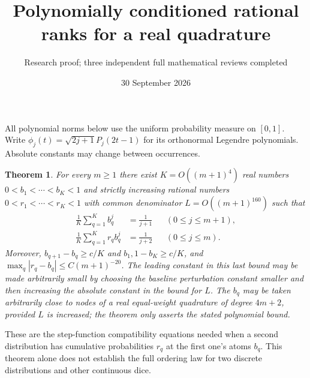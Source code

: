 \documentclass[11pt]{article}
\title{Polynomially conditioned rational ranks for a real quadrature}
\author{Research proof; three independent full mathematical reviews completed}
\date{30 September 2026}
\newtheorem{theorem}{Theorem}
\begin{document}
\maketitle
All polynomial norms below use the uniform probability measure on $[0,1]$.
Write $\phi_j(t)=\sqrt{2j+1}P_j(2t-1)$ for its orthonormal Legendre
polynomials. Absolute constants may change between occurrences.

\begin{theorem}\label{main}
For every $m\ge1$ there exist $K=O((m+1)^4)$ real numbers
$0<b_1<\cdots<b_K<1$ and strictly increasing rational numbers
$0<r_1<\cdots<r_K<1$ with common denominator
$L=O((m+1)^{160})$ such that
\begin{align}
 \frac1K\sum_{q=1}^K b_q^j&=\frac1{j+1}
                                      &&(0\le j\le m+1),\label{mom}\\
 \frac1K\sum_{q=1}^K r_q b_q^j&=\frac1{j+2}
                                      &&(0\le j\le m).\label{rank}
\end{align}
Moreover, $b_{q+1}-b_q\ge c/K$ and
$b_1,1-b_K\ge c/K$, and $\max_q|r_q-b_q|\le C(m+1)^{-20}$.
The leading constant in this last bound may be made arbitrarily small
by choosing the baseline perturbation constant smaller and then increasing
the absolute constant in the bound for $L$. The $b_q$ may be taken arbitrarily close to
nodes of a real equal-weight quadrature of degree $4m+2$, provided
$L$ is increased; the theorem only asserts the stated polynomial bound.
\end{theorem}

These are the step-function compatibility equations needed when a
second distribution has cumulative probabilities $r_q$ at the first
one's atoms $b_q$. This theorem alone does not establish the full
ordering law for two discrete distributions and other continuous dice.
\end{document}
